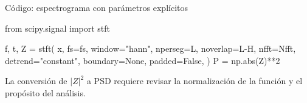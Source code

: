 \documentclass[
  ignorenonframetext,
  aspectratio=169,
  spanish,
]{beamer}
\newenvironment{Shaded}{\begin{snugshade}}{\end{snugshade}}
\newcommand{\BuiltInTok}[1]{\textcolor[rgb]{0.00,0.23,0.31}{#1}}
\newcommand{\DecValTok}[1]{\textcolor[rgb]{0.68,0.00,0.00}{#1}}
\newcommand{\ImportTok}[1]{\textcolor[rgb]{0.00,0.46,0.62}{#1}}
\newcommand{\NormalTok}[1]{\textcolor[rgb]{0.00,0.23,0.31}{#1}}
\newcommand{\OperatorTok}[1]{\textcolor[rgb]{0.37,0.37,0.37}{#1}}
\newcommand{\StringTok}[1]{\textcolor[rgb]{0.13,0.47,0.30}{#1}}
\newcommand{\VariableTok}[1]{\textcolor[rgb]{0.07,0.07,0.07}{#1}}
\begin{document}
\begin{frame}[fragile]{Código: espectrograma con parámetros explícitos}
  \protect{}\label{cuxf3digo-espectrograma-con-paruxe1metros-expluxedcitos}
  \begin{Shaded}
    \begin{Highlighting}[]
      \ImportTok{from}\NormalTok{ scipy.signal }\ImportTok{import}\NormalTok{ stft}

      \NormalTok{f, t, Z }\OperatorTok{=}\NormalTok{ stft(}
      \NormalTok{    x, fs}\OperatorTok{=}\NormalTok{fs, window}\OperatorTok{=}\StringTok{"hann"}\NormalTok{,}
      \NormalTok{    nperseg}\OperatorTok{=}\NormalTok{L, noverlap}\OperatorTok{=}\NormalTok{L}\OperatorTok{{-}}\NormalTok{H,}
      \NormalTok{    nfft}\OperatorTok{=}\NormalTok{Nfft, detrend}\OperatorTok{=}\StringTok{"constant"}\NormalTok{,}
      \NormalTok{    boundary}\OperatorTok{=}\VariableTok{None}\NormalTok{, padded}\OperatorTok{=}\VariableTok{False}\NormalTok{,}
      \NormalTok{)}
      \NormalTok{P }\OperatorTok{=}\NormalTok{ np.}\BuiltInTok{abs}\NormalTok{(Z)}\OperatorTok{**}\DecValTok{2}
    \end{Highlighting}
  \end{Shaded}

  \begin{tcolorbox}[enhanced jigsaw, arc=.35mm, bottomrule=.15mm, bottomtitle=1mm, breakable, colback=white, colbacktitle=quarto-callout-note-color!10!white, colframe=quarto-callout-note-color-frame, coltitle=black, left=2mm, leftrule=.75mm, opacityback=0, opacitybacktitle=0.6, rightrule=.15mm, title=\textcolor{quarto-callout-note-color}{\faInfo}\hspace{0.5em}{Nota}, titlerule=0mm, toprule=.15mm, toptitle=1mm]

    La conversión de \(|Z|^2\) a PSD requiere revisar la normalización de la
    función y el propósito del análisis.

  \end{tcolorbox}
\end{frame}
\end{document}
